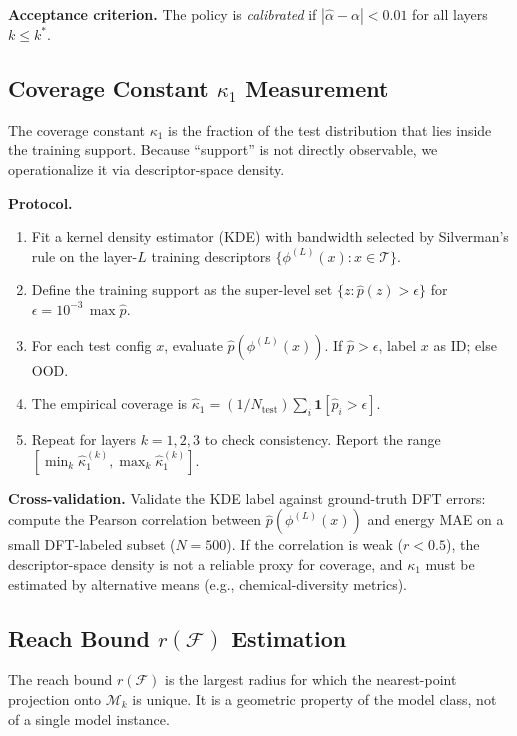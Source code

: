 \documentclass[11pt,a4paper]{article}
\begin{document}
\textbf{Acceptance criterion.} The policy is \emph{calibrated} if $|\hat\alpha - \alpha| < 0.01$ for all layers $k\le k^*$.

\subsection{Coverage Constant $\kappa_1$ Measurement}\label{sec:empirical:kappa}

The coverage constant $\kappa_1$ is the fraction of the test distribution that lies inside the training support. Because ``support'' is not directly observable, we operationalize it via descriptor-space density.

\textbf{Protocol.}
\begin{enumerate}
    \item Fit a kernel density estimator (KDE) with bandwidth selected by Silverman's rule on the layer-$L$ training descriptors $\{\phi^{(L)}(x):x\in\mathcal{T}\}$.
    \item Define the training support as the super-level set $\{z: \hat p(z) > \epsilon\}$ for $\epsilon = 10^{-3}\,\max\hat p$.
    \item For each test config $x$, evaluate $\hat p(\phi^{(L)}(x))$. If $\hat p > \epsilon$, label $x$ as ID; else OOD.
    \item The empirical coverage is $\hat\kappa_1 = (1/N_{\text{test}})\sum_i \mathbf{1}[\hat p_i > \epsilon]$.
    \item Repeat for layers $k=1,2,3$ to check consistency. Report the range $[\min_k\hat\kappa_1^{(k)}, \max_k\hat\kappa_1^{(k)}]$.
\end{enumerate}

\textbf{Cross-validation.} Validate the KDE label against ground-truth DFT errors: compute the Pearson correlation between $\hat p(\phi^{(L)}(x))$ and energy MAE on a small DFT-labeled subset ($N=500$). If the correlation is weak ($r<0.5$), the descriptor-space density is not a reliable proxy for coverage, and $\kappa_1$ must be estimated by alternative means (e.g., chemical-diversity metrics).

\subsection{Reach Bound $r(\mathcal{F})$ Estimation}\label{sec:empirical:reach}

The reach bound $r(\mathcal{F})$ is the largest radius for which the nearest-point projection onto $\mathcal{M}_k$ is unique. It is a geometric property of the model class, not of a single model instance.
\end{document}

